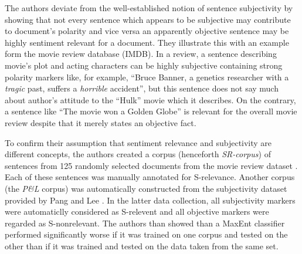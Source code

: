 \documentclass[a4paper,11pt]{article}
\begin{document}
The authors deviate from the well-established notion of sentence
subjectivity by showing that not every sentence which appears to be
subjective may contribute to document's polarity and vice versa an
apparently objective sentence may be highly sentiment relevant for a
document.  They illustrate this with an example form the movie review
database (IMDB).  In a review, a sentence describing movie's plot and
acting characters can be highly subjective containing strong polarity
markers like, for example, ``Bruce Banner, a genetics researcher with
a \textit{tragic} past, suffers a \textit{horrible} accident'', but
this sentence does not say much about author's attitude to the
``Hulk'' movie which it describes.  On the contrary, a sentence like
``The movie won a Golden Globe'' is relevant for the overall movie
review despite that it merely states an objective fact.

To confirm their assumption that sentiment relevance and subjectivity
are different concepts, the authors created a corpus (henceforth
\textit{SR-corpus}) of sentences from 125 randomly selected documents
from the movie review dataset \cite{Pang-02}.  Each of these sentences
was manually annotated for S-relevance.  Another corpus (the
\textit{P\&L} corpus) was automatically constructed from the
subjectivity dataset provided by Pang and Lee \cite{Pang-Lee-04}.  In
the latter data collection, all subjectivity markers were automaticlly
considered as S-relevent and all objective markers were regarded as
S-nonrelevant.  The authors than showed than a MaxEnt classifier
performed significantly worse if it was trained on one corpus and
tested on the other than if it was trained and tested on the data
taken from the same set.
\end{document}
